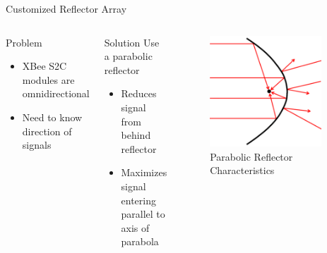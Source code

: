 \documentclass{beamer}
\begin{document}
\begin{frame}{Customized Reflector Array}
  \begin{columns}
      \begin{block}{Problem}
        \begin{itemize}
          \item XBee S2C modules are omnidirectional
          \item Need to know direction of signals
        \end{itemize}
      \end{block}
      \begin{block}{Solution}
        Use a parabolic reflector
        \begin{itemize}
          \item Reduces signal from behind reflector
          \item Maximizes signal entering parallel to axis of parabola
        \end{itemize}
      \end{block}
      \begin{figure}
        \centering
        \includegraphics[width=0.9\textwidth]{figs/img/parabolicReflectorDiagram.png}
        \caption{Parabolic Reflector Characteristics}
        \label{fig:parabolicReflectorDiagram}
      \end{figure}
  \end{columns}
\end{frame}
\end{document}
